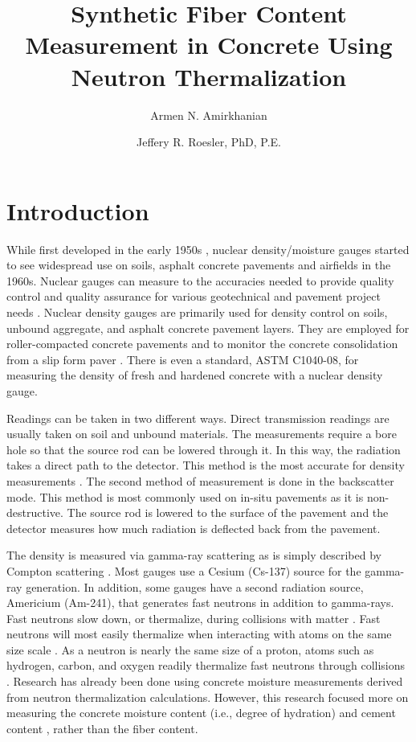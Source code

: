 \documentclass[9pt,twocolumn,twoside]{iscp}
\title{Synthetic Fiber Content Measurement in Concrete Using Neutron Thermalization}
\author[a]{Armen N. Amirkhanian}
\author[b,1]{Jeffery R. Roesler, PhD, P.E.}
\affil[a]{Graduate Research Assistant, University of Illinois Urbana-Champaign, 205 N. Mathews Ave, Urbana, IL 61801, USA}
\affil[b]{Professor, University of Illinois Urbana-Champaign, 205 N. Mathews Ave, Urbana, IL, 61801, USA}
\begin{document}
\maketitle
\thispagestyle{firststyle}

\section{Introduction}

While first developed in the early 1950s \citep{j1950a,j1952a}, nuclear density/moisture gauges started to see widespread use on soils, asphalt concrete pavements \citep{and1967a,and1967b} and airfields \citep{f1960a} in the 1960s. Nuclear gauges can measure to the accuracies needed to provide quality control and quality assurance for various geotechnical and pavement project needs \citep{s2003a,and1995a,and2002a}. Nuclear density gauges are primarily used for density control on soils, unbound aggregate, and asphalt concrete pavement layers. They are employed for roller-compacted concrete pavements \citep{RollerCompacted,kim2007a} and to monitor the concrete consolidation from a slip form paver \citep{and1996a}. There is even a standard, ASTM C1040-08, for measuring the density of fresh and hardened concrete with a nuclear density gauge.

Readings can be taken in two different ways. Direct transmission readings are usually taken on soil and unbound materials. The measurements require a bore hole so that the source rod can be lowered through it. In this way, the radiation takes a direct path to the detector. This method is the most accurate for density measurements \citep{unknown2009a}. The second method of measurement is done in the backscatter mode. This method is most commonly used on in-situ pavements as it is non-destructive. The source rod is lowered to the surface of the pavement and the detector measures how much radiation is deflected back from the pavement.

The density is measured via gamma-ray scattering as is simply described by Compton scattering \citep{a1923a}. Most gauges use a Cesium (Cs-137) source for the gamma-ray generation. In addition, some gauges have a second radiation source, Americium (Am-241), that generates fast neutrons in addition to gamma-rays. Fast neutrons slow down, or thermalize, during collisions with matter \citep{and1971a, foderaro1971a}. Fast neutrons will most easily thermalize when interacting with atoms on the same size scale \citep{and1971a, foderaro1971a, Nuke16}. As a neutron is nearly the same size of a proton, atoms such as hydrogen, carbon, and oxygen readily thermalize fast neutrons through collisions \citep{Nuke16,f1992a}. Research has already been done using concrete moisture measurements derived from neutron thermalization calculations. However, this research focused more on measuring the concrete moisture content (i.e., degree of hydration) \citep{Nuke18,Nuke19} and cement content \citep{and1999a}, rather than the fiber content.
\end{document}
